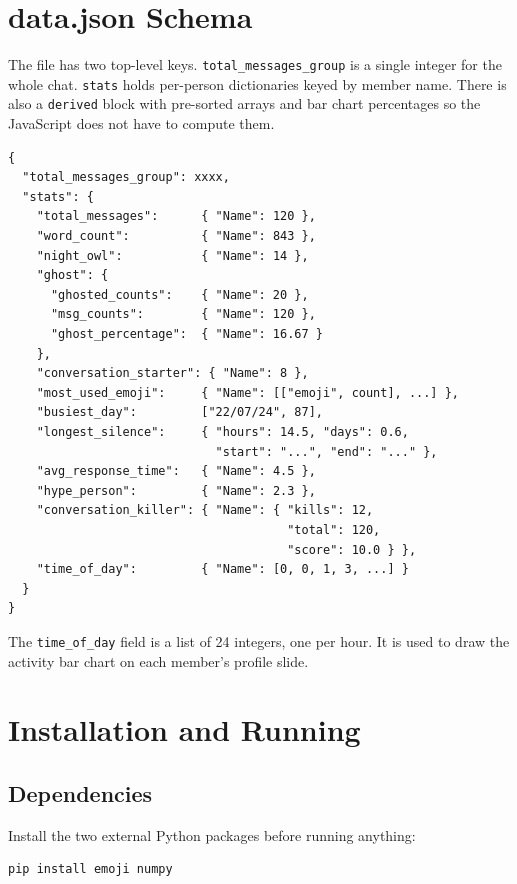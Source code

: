 \documentclass{article}
\begin{document}
\section{data.json Schema}

The file has two top-level keys. \texttt{total\_messages\_group} is a single integer for the whole chat. \texttt{stats} holds per-person dictionaries keyed by member name. There is also a \texttt{derived} block with pre-sorted arrays and bar chart percentages so the JavaScript does not have to compute them.

\begin{verbatim}
{
  "total_messages_group": xxxx,
  "stats": {
    "total_messages":      { "Name": 120 },
    "word_count":          { "Name": 843 },
    "night_owl":           { "Name": 14 },
    "ghost": {
      "ghosted_counts":    { "Name": 20 },
      "msg_counts":        { "Name": 120 },
      "ghost_percentage":  { "Name": 16.67 }
    },
    "conversation_starter": { "Name": 8 },
    "most_used_emoji":     { "Name": [["emoji", count], ...] },
    "busiest_day":         ["22/07/24", 87],
    "longest_silence":     { "hours": 14.5, "days": 0.6,
                             "start": "...", "end": "..." },
    "avg_response_time":   { "Name": 4.5 },
    "hype_person":         { "Name": 2.3 },
    "conversation_killer": { "Name": { "kills": 12,
                                       "total": 120,
                                       "score": 10.0 } },
    "time_of_day":         { "Name": [0, 0, 1, 3, ...] }
  }
}
\end{verbatim}

The \texttt{time\_of\_day} field is a list of 24 integers, one per hour. It is used to draw the activity bar chart on each member's profile slide.

\section{Installation and Running}

\subsection*{Dependencies}

Install the two external Python packages before running anything:

\begin{verbatim}
pip install emoji numpy
\end{verbatim}
\end{document}

